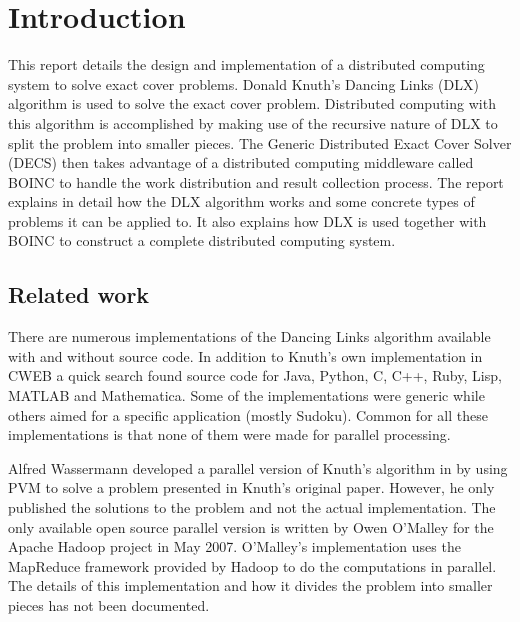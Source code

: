 
\chapter{Introduction}

This report details the design and implementation of a distributed computing system to solve exact cover problems.
Donald Knuth's Dancing Links (DLX) algorithm \cite{knuth00dancing} is used to solve the exact cover problem.
Distributed computing with this algorithm is accomplished by making use of the recursive nature of DLX to split the problem into smaller pieces.
The Generic Distributed Exact Cover Solver (DECS) then takes advantage of a distributed computing middleware called BOINC \cite{boinc} to handle the work distribution and result collection process.
The report explains in detail how the DLX algorithm works and some concrete types of problems it can be applied to.
It also explains how DLX is used together with BOINC to construct a complete distributed computing system.



\section{Related work}

There are numerous implementations of the Dancing Links algorithm available with and without source code.
In addition to Knuth's own implementation in CWEB \cite{cweb} a quick search found source code for Java, Python, C, C++, Ruby, Lisp, MATLAB and Mathematica.
Some of the implementations were generic while others aimed for a specific application (mostly Sudoku).
Common for all these implementations is that none of them were made for parallel processing.

Alfred Wassermann developed a parallel version of Knuth's algorithm in \cite{wassermann99covering} by using PVM \cite{pvm} to solve a problem presented in Knuth's original paper.
However, he only published the solutions to the problem and not the actual implementation.
The only available open source parallel version is written by Owen O'Malley for the Apache Hadoop project \cite{hadoop} in May 2007.
O'Malley's implementation uses the MapReduce framework \cite{map-reduce} provided by Hadoop to do the computations in parallel.
The details of this implementation and how it divides the problem into smaller pieces has not been documented.



